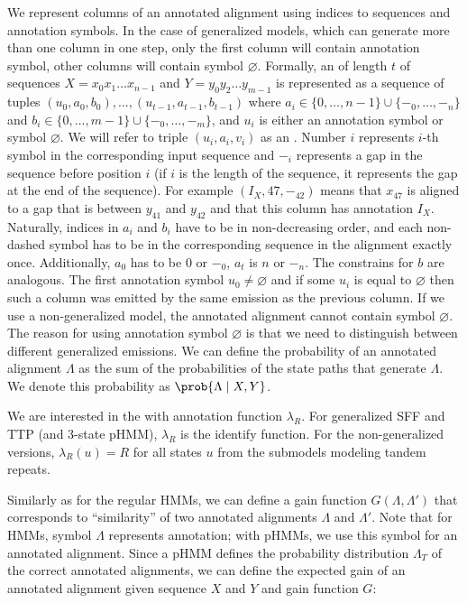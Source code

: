 We represent columns of an annotated alignment using indices to sequences and
annotation symbols. In the case of generalized models, which can generate more
than one column in one step, only the first column will contain annotation
symbol, other columns will contain symbol $\varnothing$. Formally, an
 of length $t$ of sequences $X=x_0x_1\dots
x_{n-1}$ and $Y=y_0y_2\dots y_{m-1}$ is represented as a sequence of tuples
$(u_0, a_0, b_0), \dots, (u_{t-1}, a_{t-1}, b_{t-1})$ where $a_i\in \{0, \dots,
{n-1}\}\cup\{-_0, \dots, -_n\}$ and $b_i \in \{0, \dots, m-1\}\cup\{-_0, \dots,
-_m\}$, and $u_i$ is either an annotation symbol or symbol $\varnothing$. We
will refer to triple $(u_i, a_i, v_i)$ as an .  Number $i$ represents $i$-th symbol in the corresponding input
sequence and $-_i$ represents a gap in the sequence before position $i$ (if $i$
is the length of the sequence, it represents the gap at the end of the
sequence). For example $(I_X, 47, -_{42})$ means that $x_{47}$ is aligned to a
gap that is between $y_{41}$ and $y_{42}$ and that this column has annotation
$I_X$.  Naturally, indices in $a_i$ and $b_i$ have to be in non-decreasing
order, and each non-dashed symbol has to be in the corresponding sequence in
the alignment exactly once. Additionally, $a_0$ has to be $0$ or $-_{0}$, $a_t$
is $n$ or $-_n$. The constrains for $b$ are analogous.  The first annotation
symbol $u_0\not=\varnothing$ and if some $u_i$ is equal to $\varnothing$ then
such a column was emitted by the same emission as the previous column.  If we
use a non-generalized model, the annotated alignment cannot contain symbol
$\varnothing$. The reason for using annotation symbol $\varnothing$ is that we
need to distinguish between different generalized emissions.  We can define the
probability of an annotated alignment $\Lambda$ as the sum of the probabilities
of the state paths that generate $\Lambda$. We denote this probability as
$\prob{\Lambda\mid X, Y}$.

We are interested in the  with annotation
function $\lambda_R$.  For generalized SFF and TTP (and 3-state pHMM),
$\lambda_R$ is the identify function. For the non-generalized versions,
$\lambda_R(u)=R$ for all states $u$ from the submodels modeling tandem repeats.

Similarly as for the regular HMMs, we can define a gain function $G(\Lambda,
\Lambda')$ that corresponds to ``similarity'' of two annotated alignments
$\Lambda$ and $\Lambda'$. Note that for HMMs, symbol $\Lambda$ represents
annotation; with pHMMs, we use this symbol for an annotated alignment.  Since a
pHMM defines the probability distribution $\Lambda_T$ of the correct annotated
alignments, we can define the expected gain of an annotated alignment given
sequence $X$ and $Y$ and gain function $G$: 

